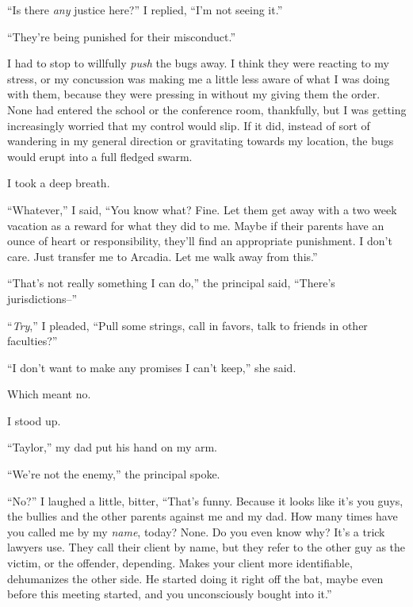 ``Is there \emph{any }justice here?'' I replied, ``I'm not seeing it.''



``They're being punished for their misconduct.''



I had to stop to willfully \emph{push} the bugs away.  I think they were reacting to my stress, or my concussion was making me a little less aware of what I was doing with them, because they were pressing in without my giving them the order.  None had entered the school or the conference room, thankfully, but I was getting increasingly worried that my control would slip.  If it did, instead of sort of wandering in my general direction or gravitating towards my location, the bugs would erupt into a full fledged swarm.



I took a deep breath.



``Whatever,'' I said, ``You know what?  Fine.  Let them get away with a two week vacation as a reward for what they did to me.  Maybe if their parents have an ounce of heart or responsibility, they'll find an appropriate punishment.  I don't care.  Just transfer me to Arcadia.  Let me walk away from this.''



``That's not really something I can do,'' the principal said, ``There's jurisdictions--''



``\emph{Try},'' I pleaded, ``Pull some strings, call in favors, talk to friends in other faculties?''



``I don't want to make any promises I can't keep,'' she said.



Which meant no.



I stood up.



``Taylor,'' my dad put his hand on my arm.



``We're not the enemy,'' the principal spoke.



``No?'' I laughed a little, bitter, ``That's funny.  Because it looks like it's you guys, the bullies and the other parents against me and my dad.  How many times have you called me by my \emph{name}, today?  None.  Do you even know why?  It's a trick lawyers use.  They call their client by name, but they refer to the other guy as the victim, or the offender, depending.  Makes your client more identifiable, dehumanizes the other side.  He started doing it right off the bat, maybe even before this meeting started, and you unconsciously bought into it.''



